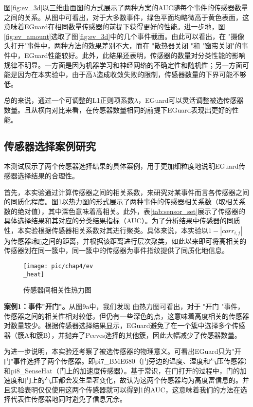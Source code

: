 图\ref{fig:ev_3d}以三维曲面图的方式展示了两种方案的AUC随每个事件的传感器数量之间的关系。从图中可看出，对于大多数事件，绿色平面均略微高于黄色表面，这意味着EGuard在相同数量传感器的前提下获得更好的性能。进一步地，图\ref{fig:ev_amount}选取了图\ref{fig:ev_3d}中的几个事件截面。由此可以看出，在 "摄像头打开"事件中，两种方法的效果差别不大，而在 "散热器关闭 "和 "窗帘关闭"的事件中，EGuard性能较好。此外，此结果还表明，传感器的数量对分类性能的影响规律不明显。一方面是因为机器学习和神经网络的不确定性和随机性；另一方面可能是因为在本实验中，由于高$\lambda$造成收敛失败的限制，传感器数量的下界可能不够低。

总的来说，通过一个可调整的L1正则项系数$\lambda$，EGuard可以灵活调整被选传感器数量。且从横向对比来看，在传感器数量相同的前提下EGuard表现出更好的性能。

\subsection{传感器选择案例研究}

本测试展示了两个传感器选择结果的具体案例，用于更加细粒度地说明EGuard传感器选择结果的合理性。

首先，本实验通过计算传感器之间的相关系数，来研究对某事件而言各传感器之间的同质化程度。图\ref{fig:ev_heat}以热力图的形式展示了两种事件的传感器相关系数（取相关系数的绝对值），其中深色意味着高相关。此外，表\ref{tab:sensor_set}展示了传感器的具体选择结果和其对应的分类结果指标（AUC）。为了分析结果中传感器的同质性，本实验根据传感器相关系数对其进行聚类。具体来说，本实验以$1-|corr_{i,j}|$为传感器i和j之间的距离，并根据该距离进行层次聚类，如此以来即可将高相关的传感器划在同一簇中，同一簇中的传感器为事件指纹提供了同质化地信息。

\begin{figure}[!h]
	\centering
	\texttt{[image: pic/chap4/ev\\\_heat]}
	\caption{传感器间相关性热力图}
	\label{fig:ev_heat}
\end{figure}

\textbf{案例1：事件"开门"。}从图9a中，我们发现
由热力图可看出，对于 "开门 "事件，传感器之间的相关性相对较低，但仍有一些深色的点，这意味着高度相关的传感器对数量较少。根据传感器选择结果显示，EGuard避免了在一个簇中选择多个传感器（簇A和簇B），并抛弃了Peeves选择的其他簇，因此大幅减少了传感器数量。

为进一步说明，本实验还考察了被选传感器的物理意义。可看出EGuard只为"开门"事件选择了两个传感器。即pi7\_BME680（门旁边的温度、湿度和气压传感器）和pi8\_SenseHat（门上的加速度传感器）。基于常识，在门打开的过程中，门的加速度和门上的气压都会发生显著变化，故认为这两个传感器均为高度富信息的。并且实验表明仅仅使用这两个传感器就可以得到1的AUC，这意味着我们的方法在选择代表性传感器地同时避免了信息冗余。

